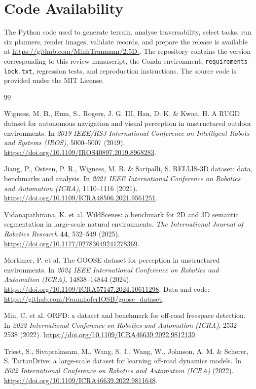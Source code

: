 \documentclass[11pt]{article}
\newcommand{\coderepository}{\url{https://github.com/MinhTrannnnn/2.5D-}}
\begin{document}
\section{Code Availability}

The Python code used to generate terrain, analyse traversability, select tasks,
run six planners, render images, validate records, and prepare the release is
available at \coderepository{}. The repository contains the version
corresponding to this review manuscript, the Conda environment,
\texttt{requirements-lock.txt}, regression tests, and reproduction
instructions. The source code is provided under the MIT License.

\begin{thebibliography}{99}

Wigness, M. B., Eum, S., Rogers, J. G. III, Han, D. K. \& Kwon, H. A RUGD
dataset for autonomous navigation and visual perception in unstructured outdoor
environments. In \textit{2019 IEEE/RSJ International Conference on Intelligent
Robots and Systems (IROS)}, 5000--5007 (2019).
\url{https://doi.org/10.1109/IROS40897.2019.8968283}.

Jiang, P., Osteen, P. R., Wigness, M. B. \& Saripalli, S. RELLIS-3D dataset:
data, benchmarks and analysis. In \textit{2021 IEEE International Conference on
Robotics and Automation (ICRA)}, 1110--1116 (2021).
\url{https://doi.org/10.1109/ICRA48506.2021.9561251}.

Vidanapathirana, K. et al. WildScenes: a benchmark for 2D and 3D semantic
segmentation in large-scale natural environments. \textit{The International
Journal of Robotics Research} \textbf{44}, 532--549 (2025).
\url{https://doi.org/10.1177/02783649241278369}.

Mortimer, P. et al. The GOOSE dataset for perception in unstructured
environments. In \textit{2024 IEEE International Conference on Robotics and
Automation (ICRA)}, 14838--14844 (2024).
\url{https://doi.org/10.1109/ICRA57147.2024.10611298}.
Data and code: \url{https://github.com/FraunhoferIOSB/goose_dataset}.

Min, C. et al. ORFD: a dataset and benchmark for off-road freespace detection.
In \textit{2022 International Conference on Robotics and Automation (ICRA)},
2532--2538 (2022).
\url{https://doi.org/10.1109/ICRA46639.2022.9812139}.

Triest, S., Sivaprakasam, M., Wang, S. J., Wang, W., Johnson, A. M. \& Scherer,
S. TartanDrive: a large-scale dataset for learning off-road dynamics models. In
\textit{2022 International Conference on Robotics and Automation (ICRA)}
(2022). \url{https://doi.org/10.1109/ICRA46639.2022.9811648}.


\end{thebibliography}
\end{document}
